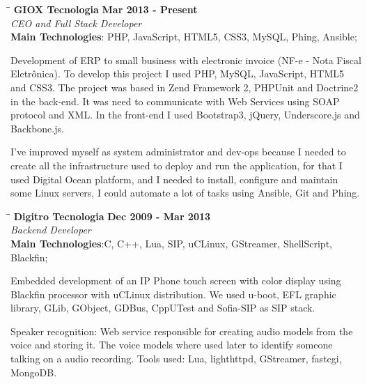 \documentclass[margin]{res}
\begin{document}
\begin{resume}
\vspace{-0.1in}
    \begin{tabbing}
    \hspace{2.3in}\= \hspace{1.7in}\= \kill
    \textbf{GIOX Tecnologia}    \>\>\textbf{Mar 2013 - Present}\\
    \textit{CEO and Full Stack Developer}\\
    \textbf{Main Technologies}: PHP, JavaScript, HTML5, CSS3, MySQL, Phing, Ansible;
    \end{tabbing}\vspace{-20pt}
    \vspace{2mm}
Development of ERP to small business with electronic invoice (NF-e - Nota Fiscal Eletrônica). To develop this project I used PHP, MySQL, JavaScript, HTML5 and CSS3. The project was based in Zend Framework 2, PHPUnit and Doctrine2 in the back-end. It was need to communicate with Web Services using SOAP protocol and XML. In the front-end I used Bootstrap3, jQuery, Underscore.js and Backbone.js.

I've improved myself as system administrator and dev-ops because I needed to create all the infrastructure used to deploy and run the application, for that I used Digital Ocean platform, and I needed to install, configure and maintain some Linux servers, I could automate a lot of tasks using Ansible, Git and Phing.

\vspace{-0.1in}
    \begin{tabbing}
    \hspace{2.3in}\= \hspace{1.7in}\= \kill
    \textbf{Digitro Tecnologia}    \>\>\textbf{Dec 2009 - Mar 2013}\\
    \textit{Backend Developer}\\
    \textbf{Main Technologies}:C, C++, Lua, SIP, uCLinux, GStreamer, ShellScript, Blackfin;
    \end{tabbing}\vspace{-20pt}
    \vspace{2mm}
Embedded development of an IP Phone touch screen with color display using Blackfin processor with uCLinux distribution. We used u-boot, EFL graphic library, GLib, GObject, GDBus, CppUTest and Sofia-SIP as SIP stack.
    
Speaker recognition: Web service responsible for creating audio models from the voice and storing it. The voice models where used later to identify someone talking on a audio recording. Tools used: Lua, lighthttpd, GStreamer, fastcgi, MongoDB.


\end{resume}
\end{document}
